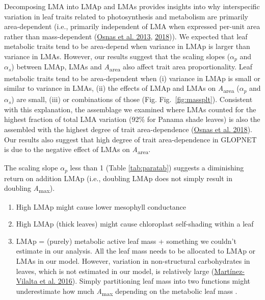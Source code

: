 \documentclass[
  12pt,
  a4paper,
,tablecaptionabove
]{scrartcl}
\providecommand{\tightlist}{%
  \setlength{\itemsep}{0pt}\setlength{\parskip}{0pt}}
\begin{document}
Decomposing LMA into LMAp and LMAs provides insights into why interspecific variation in leaf traits related to photosynthesis and metabolism are primarily area-dependent (i.e., primarily independent of LMA when expressed per-unit area rather than mass-dependent (\protect\hyperlink{ref-Osnas2013}{Osnas et al. 2013}, \protect\hyperlink{ref-Osnas2018}{2018})).
We expected that leaf metabolic traits tend to be area-depend when variance in LMAp is larger than variance in LMAs.
However, our results suggest that the scaling slopes (\(\alpha_p\) and \(\alpha_s\)) between LMAp, LMAs and \emph{A}\textsubscript{area} also affect trait area proportionality.
Leaf metabolic traits tend to be area-dependent when (i) variance in LMAp is small or similar to variance in LMAs, (ii) the effects of LMAp and LMAs on \emph{A}\textsubscript{area} (\(\alpha_p\) and \(\alpha_s\)) are small, (iii) or combinations of those (Fig. Fig.~\ref{fig:massplt}).
Consistent with this explanation, the assemblage we examined where LMAs counted for the highest fraction of total LMA variation (92\% for Panama shade leaves) is also the assembled with the highest degree of trait area-dependence (\protect\hyperlink{ref-Osnas2018}{Osnas et al. 2018}).
Our results also suggest that high degree of trait area-dependence in GLOPNET is due to the negative effect of LMAs on \emph{A}\textsubscript{area}.

The scaling slope \(\alpha_p\) less than 1 (Table \ref{tab:paratab}) suggests a diminishing return on addition LMAp (i.e., doubling LMAp does not simply result in doubling \emph{A}\textsubscript{max}).

\begin{enumerate}
\def\labelenumi{\arabic{enumi}.}
\tightlist
\item
  High LMAp might cause lower mesophyll conductance
\item
  High LMAp (thick leaves) might cause chloroplast self-shading within a leaf
\item
  LMAp = (purely) metabolic active leaf mass + something we couldn't estimate in our analysis. All the leaf mass needs to be allocated to LMAp or LMAs in our model. However, variation in non-structural carbohydrates in leaves, which is not estimated in our model, is relatively large (\protect\hyperlink{ref-Martinez-Vilalta2016}{Martínez-Vilalta et al. 2016}). Simply partitioning leaf mass into two functions might underestimate how much \emph{A}\textsubscript{max} depending on the metabolic leaf mass .
\end{enumerate}
\end{document}
